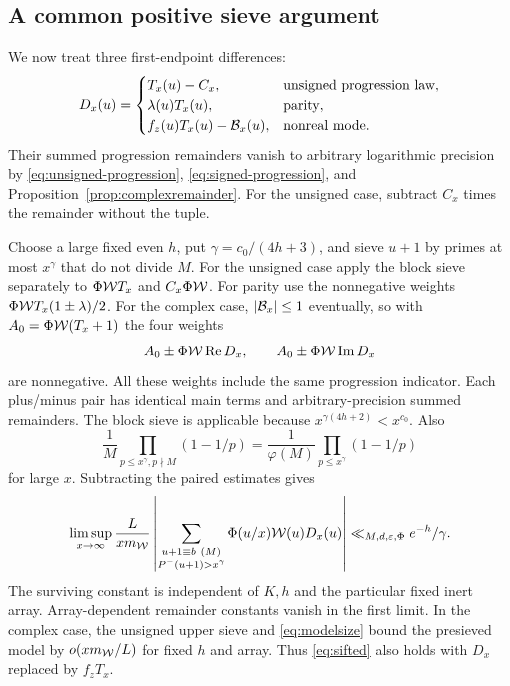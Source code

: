 \subsection{A common positive sieve argument}

We now treat three first-endpoint differences:
\begin{equation}\label{eq:threecores}
 D_x(u)=
 \begin{cases}
 T_x(u)-C_x,&\text{unsigned progression law},\\
 \lambda(u)T_x(u),&\text{parity},\\
 f_z(u)T_x(u)-\mathcal B_x(u),&\text{nonreal mode}.
 \end{cases}
\end{equation}
Their summed progression remainders vanish to arbitrary logarithmic
precision by \eqref{eq:unsigned-progression},
\eqref{eq:signed-progression}, and
Proposition~\ref{prop:complexremainder}. For the unsigned case,
subtract $C_x$ times the remainder without the tuple.

Choose a large fixed even $h$, put $\gamma=c_0/(4h+3)$, and sieve
$u+1$ by primes at most $x^\gamma$ that do not divide $M$.
For the unsigned case apply the block sieve separately to
$\Phi\mathcal W T_x$ and $C_x\Phi\mathcal W$. For parity use the nonnegative
weights $\Phi\mathcal W T_x(1\pm\lambda)/2$.
For the complex case, $|\mathcal B_x|\leq1$ eventually, so with
$A_0=\Phi\mathcal W(T_x+1)$ the four weights
\[
 A_0\pm\Phi\mathcal W\operatorname{Re} D_x,\qquad
 A_0\pm\Phi\mathcal W\operatorname{Im} D_x
\]
are nonnegative. All these weights include the same progression
indicator. Each plus/minus pair has identical main terms and
arbitrary-precision summed remainders. The block sieve is applicable
because $x^{\gamma(4h+2)}<x^{c_0}$. Also
\[
 \frac1M\prod_{p\leq x^\gamma, p\nmid M}(1-1/p)
 =\frac1{\varphi(M)}\prod_{p\leq x^\gamma}(1-1/p)
\]
for large $x$. Subtracting the paired estimates gives
\begin{equation}\label{eq:sifted}
 \limsup_{x\to\infty}\frac{L}{xm_{\mathcal W}}
 \left|\sum_{\substack{u+1\equiv b\ (M)\\P^-(u+1)>x^\gamma}}
       \Phi(u/x)\mathcal W(u)D_x(u)\right|
 \ll_{M,d,\varepsilon,\Phi}e^{-h}/\gamma.
\end{equation}
The surviving constant is independent of $K,h$ and the particular
fixed inert array. Array-dependent remainder constants vanish in
the first limit. In the complex case, the unsigned upper sieve and
\eqref{eq:modelsize} bound the presieved model by
$o(xm_{\mathcal W}/L)$ for fixed $h$ and array. Thus
\eqref{eq:sifted} also holds with $D_x$ replaced by $f_zT_x$.

